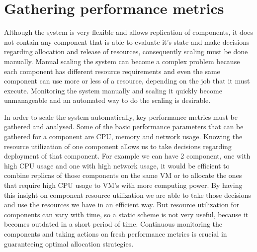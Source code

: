 \section{Gathering performance metrics}
\label{sec:performance}
Although the system is very flexible and allows replication of components, it does not contain any component that is able to evaluate it's state and make decisions regarding allocation and release of resources, consequently scaling must be done manually. Manual scaling the system can become a complex problem because each component has different resource requirements and even the same component can use more or less of a resource, depending on the job that it must execute. Monitoring the system manually and scaling it quickly become unmanageable and an automated way to do the scaling is desirable. 

In order to scale the system automatically, key performance metrics must be gathered and analysed. Some of the basic performance parameters that can be gathered for a component are CPU, memory and network usage. Knowing the resource utilization of one component allows us to take decisions regarding deployment of that component. For example we can have 2 component, one with high CPU usage and one with high network usage, it would be efficient to combine replicas of those components on the same VM or to allocate the ones that require high CPU usage to VM's with more computing power. By having this insight on component resource utilization we are able to take those decisions and use the resources  we have in an efficient way. But resource utilization for components can vary with time, so a static scheme is not very useful, because it becomes outdated in a short period of time. Continuous monitoring the components and taking actions on fresh performance metrics is crucial in guaranteeing optimal allocation strategies.

